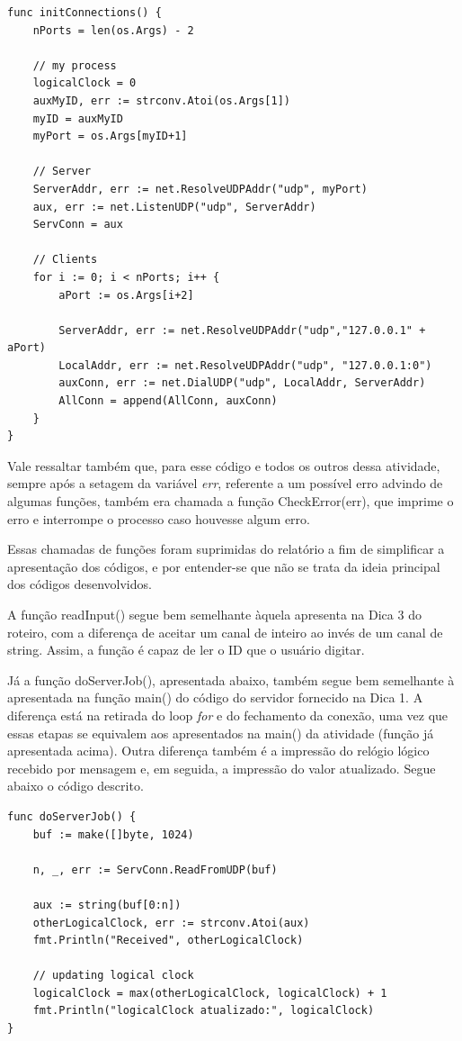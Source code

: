 \documentclass[conference]{IEEEtran}
\begin{document}
\begin{lstlisting}
func initConnections() {
	nPorts = len(os.Args) - 2

	// my process
	logicalClock = 0
	auxMyID, err := strconv.Atoi(os.Args[1])
	myID = auxMyID
	myPort = os.Args[myID+1]

	// Server
	ServerAddr, err := net.ResolveUDPAddr("udp", myPort)
	aux, err := net.ListenUDP("udp", ServerAddr)
	ServConn = aux

	// Clients
	for i := 0; i < nPorts; i++ {
		aPort := os.Args[i+2]
		
		ServerAddr, err := net.ResolveUDPAddr("udp","127.0.0.1" + aPort)
		LocalAddr, err := net.ResolveUDPAddr("udp", "127.0.0.1:0")
		auxConn, err := net.DialUDP("udp", LocalAddr, ServerAddr)
		AllConn = append(AllConn, auxConn)
	}
}
\end{lstlisting}

	Vale ressaltar também que, para esse código e todos os outros dessa atividade, sempre após a setagem da variável \textit{err}, referente a um possível erro advindo de algumas funções, também era chamada a função CheckError(err), que imprime o erro e interrompe o processo caso houvesse algum erro.
	
	Essas chamadas de funções foram suprimidas do relatório a fim de simplificar a apresentação dos códigos, e por entender-se que não se trata da ideia principal dos códigos desenvolvidos.
	
	A função readInput() segue bem semelhante àquela apresenta na Dica 3 do roteiro, com a diferença de aceitar um canal de inteiro ao invés de um canal de string. Assim, a função é capaz de ler o ID que o usuário digitar.
	
	Já a função doServerJob(), apresentada abaixo, também segue bem semelhante à apresentada na função main() do código do servidor fornecido na Dica 1. A diferença está na retirada do loop \textit{for} e do fechamento da conexão, uma vez que essas etapas se equivalem aos apresentados na main() da atividade (função já apresentada acima). Outra diferença também é a impressão do relógio lógico recebido por mensagem e, em seguida, a impressão do valor atualizado. Segue abaixo o código descrito.

\begin{lstlisting}
func doServerJob() {
	buf := make([]byte, 1024)

	n, _, err := ServConn.ReadFromUDP(buf)

	aux := string(buf[0:n])
	otherLogicalClock, err := strconv.Atoi(aux)
	fmt.Println("Received", otherLogicalClock)
	
	// updating logical clock
	logicalClock = max(otherLogicalClock, logicalClock) + 1
	fmt.Println("logicalClock atualizado:", logicalClock)
}
\end{lstlisting}
\end{document}

